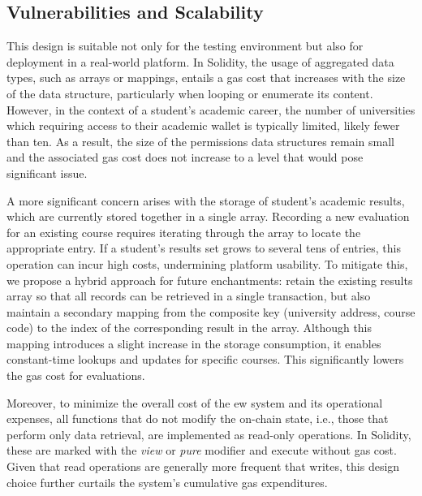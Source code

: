 \subsection{Vulnerabilities and Scalability}
This design is suitable not only for the testing environment but also for deployment in a real-world platform. In Solidity, the usage of aggregated data types, such as arrays or mappings, entails a gas cost that increases with the size of the data structure, particularly when looping or enumerate its content. However, in the context of a student's academic career, the number of universities which requiring access to their academic wallet is typically limited, likely fewer than ten. As a result, the size of the permissions data structures remain small and the associated gas cost does not increase to a level that would pose significant issue.

A more significant concern arises with the storage of student's academic results, which are currently stored together in a single array. Recording a new evaluation for an existing course requires iterating through the array to locate the appropriate entry. If a student's results set grows to several tens of entries, this operation can incur high costs, undermining platform usability. To mitigate this, we propose a hybrid approach for future enchantments: retain the existing results array so that all records can be retrieved in a single transaction, but also maintain a secondary mapping from the composite key (university address, course code) to the index of the corresponding result in the array. Although this mapping introduces a slight increase in the storage consumption, it enables constant-time lookups and updates for specific courses. This significantly lowers the gas cost for evaluations.  

Moreover, to minimize the overall cost of the \acrlong{ew} system and its operational expenses, all functions that do not modify the on-chain state, i.e., those that perform only data retrieval, are implemented as read-only operations. In Solidity, these are marked with the \textit{view} or \textit{pure} modifier and execute without gas cost. Given that read operations are generally more frequent that writes, this design choice further curtails the system's cumulative gas expenditures.

